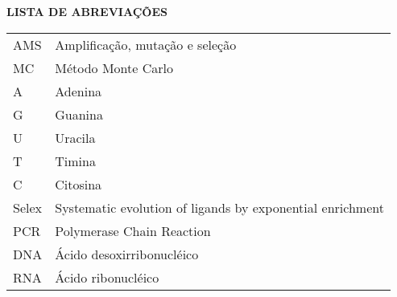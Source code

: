 \begin{center}
\textsc{\textbf{\Large LISTA DE ABREVIAÇÕES }}
\end{center}
\vspace{2cm}


\begin{center}

\begin{tabular}{l|l}

AMS   & Amplificação, mutação e seleção\\
MC    & Método Monte Carlo\\
A     & Adenina\\
G     & Guanina\\
U     & Uracila\\
T     & Timina\\
C     & Citosina\\
Selex & Systematic evolution of ligands by exponential enrichment\\
PCR   & Polymerase Chain Reaction\\
DNA   & Ácido desoxirribonucléico\\
RNA   & Ácido ribonucléico\\
\end{tabular}

\end{center}